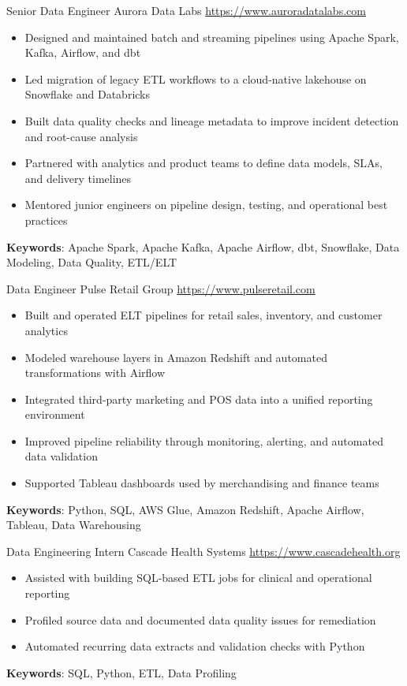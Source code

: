 \documentclass[a4paper, serif, 10pt]{moderncv}
\begin{document}
        {Senior Data Engineer}
        {Aurora Data Labs}
        {\url{https://www.auroradatalabs.com}}
        {}
        {\begin{itemize}
\item Designed and maintained batch and streaming pipelines using Apache Spark, Kafka, Airflow, and dbt
\item Led migration of legacy ETL workflows to a cloud-native lakehouse on Snowflake and Databricks
\item Built data quality checks and lineage metadata to improve incident detection and root-cause analysis
\item Partnered with analytics and product teams to define data models, SLAs, and delivery timelines
\item Mentored junior engineers on pipeline design, testing, and operational best practices
\end{itemize}
\textbf{Keywords}: Apache Spark, Apache Kafka, Apache Airflow, dbt, Snowflake, Data Modeling, Data Quality, ETL/ELT}

        {Data Engineer}
        {Pulse Retail Group}
        {\url{https://www.pulseretail.com}}
        {}
        {\begin{itemize}
\item Built and operated ELT pipelines for retail sales, inventory, and customer analytics
\item Modeled warehouse layers in Amazon Redshift and automated transformations with Airflow
\item Integrated third-party marketing and POS data into a unified reporting environment
\item Improved pipeline reliability through monitoring, alerting, and automated data validation
\item Supported Tableau dashboards used by merchandising and finance teams
\end{itemize}
\textbf{Keywords}: Python, SQL, AWS Glue, Amazon Redshift, Apache Airflow, Tableau, Data Warehousing}

        {Data Engineering Intern}
        {Cascade Health Systems}
        {\url{https://www.cascadehealth.org}}
        {}
        {\begin{itemize}
\item Assisted with building SQL-based ETL jobs for clinical and operational reporting
\item Profiled source data and documented data quality issues for remediation
\item Automated recurring data extracts and validation checks with Python
\end{itemize}
\textbf{Keywords}: SQL, Python, ETL, Data Profiling}
\end{document}
